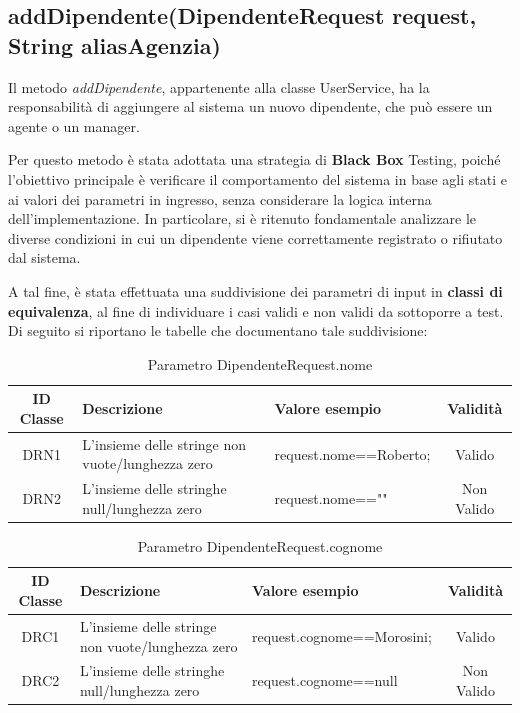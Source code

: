 \subsection{addDipendente(DipendenteRequest request, String aliasAgenzia)}

Il metodo \textit{addDipendente}, appartenente alla classe UserService, ha la responsabilità di aggiungere al sistema un nuovo dipendente, che può essere un agente o un manager.

Per questo metodo è stata adottata una strategia di\textbf{ Black Box} Testing, poiché l’obiettivo principale è verificare il comportamento del sistema in base agli stati e ai valori dei parametri in ingresso, senza considerare la logica interna dell’implementazione. In particolare, si è ritenuto fondamentale analizzare le diverse condizioni in cui un dipendente viene correttamente registrato o rifiutato dal sistema.

A tal fine, è stata effettuata una suddivisione dei parametri di input in \textbf{classi di equivalenza}, al fine di individuare i casi validi e non validi da sottoporre a test. Di seguito si riportano le tabelle che documentano tale suddivisione:

\begin{table}[H]
	\centering
	\begin{tabular}{|c|p{4cm}|p{5cm}|c|} 
		\hline
		\textbf{ID Classe} & \textbf{Descrizione} & \textbf{Valore esempio} & \textbf{Validità} \\
		\hline
		DRN1 & L'insieme delle stringe non vuote/lunghezza zero
		& request.nome==Roberto; & Valido \\
		\hline
		DRN2 & L'insieme delle stringhe null/lunghezza zero
		& request.nome=="" & Non Valido \\
		\hline
	\end{tabular}
	\caption{Parametro DipendenteRequest.nome}
	\label{tab:placeholder}
\end{table}

\begin{table}[H]
	\centering
	\begin{tabular}{|c|p{6cm}|p{5cm}|c|} 
		\hline
		\textbf{ID Classe} & \textbf{Descrizione} & \textbf{Valore esempio} & \textbf{Validità} \\
		\hline
		DRC1 & L'insieme delle stringe non vuote/lunghezza zero
		& request.cognome==Morosini; & Valido \\
		\hline
		DRC2 & L'insieme delle stringhe null/lunghezza zero
		& request.cognome==null & Non Valido \\
		\hline
	\end{tabular}
	\caption{Parametro DipendenteRequest.cognome}
	\label{tab:placeholder}
\end{table}

